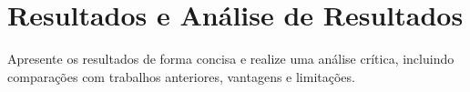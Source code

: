 \chapter{Resultados e Análise de Resultados}
Apresente os resultados de forma concisa e realize uma análise crítica, incluindo comparações com trabalhos anteriores, vantagens e limitações.
